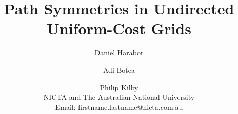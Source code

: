 \documentclass{article}
\begin{document}
\title{Path Symmetries in Undirected Uniform-Cost Grids
}
\author{Daniel Harabor \and Adi Botea \and Philip Kilby \\
NICTA and The Australian National University \\
Email: firstname.lastname@nicta.com.au}

\maketitle















\end{document}
